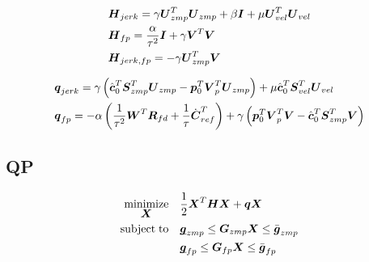 \begin{equation*}
\begin{split}
& \M{H}_{jerk} = 
    \gamma \M{U}_{zmp}^T \M{U}_{zmp}
    +
    \beta \M{I}
    +
    \mu \M{U}_{vel}^T \M{U}_{vel}\\
& \M{H}_{fp} = 
    \frac{\alpha}{\tau^2} \M{I}
    +
    \gamma \M{V}^T \M{V}\\
& \M{H}_{jerk,fp} = 
    - \gamma \M{U}_{zmp}^T \M{V}
\end{split}
\end{equation*}

\begin{equation*}
\begin{split}
& \V{q}_{jerk} = 
    \gamma 
    \left(
        \cstate_0^T \M{S}_{zmp}^T \M{U}_{zmp}
        - 
        \fp_0^T \M{V}_p^T \M{U}_{zmp} 
    \right)
    +
    \mu \cstate_0^T \M{S}_{vel}^T \M{U}_{vel}\\
& \V{q}_{fp} =
    -
    \alpha 
    \left(
        \frac{1}{\tau^2} \V{W}^T \M{R}_{fd}
        +
        \frac{1}{\tau} \cVel_{ref}^T
    \right)
    +
    \gamma 
    \left(
        \fp_0^T \M{V}_p^T \M{V}
        - 
        \cstate_0^T \M{S}_{zmp}^T \M{V}
    \right)
\end{split}
\end{equation*}


\subsection{QP}
\begin{equation*}
\begin{split}
    \minimize{\V{X}}    & \frac{1}{2} \V{X}^T\M{H}\V{X} + \V{q} \V{X}\\
    \subjectto          & \underbar{\V{g}}_{zmp}  \le  \M{G}_{zmp} \V{X}  \le  \bar{\V{g}}_{zmp}\\
                        & \underbar{\V{g}}_{fp}  \le  \M{G}_{fp} \V{X}  \le  \bar{\V{g}}_{fp}
\end{split}
\end{equation*}

